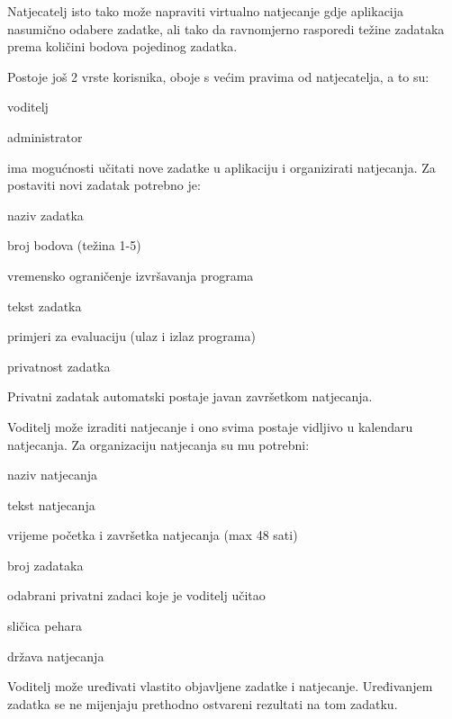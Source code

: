 		\eject
		
		Natjecatelj isto tako može napraviti virtualno natjecanje gdje aplikacija nasumično odabere zadatke, ali tako da ravnomjerno rasporedi težine zadataka prema količini bodova pojedinog zadatka. 
		
		
		
		Postoje još 2 vrste korisnika, oboje s većim pravima od natjecatelja, a to su:
		
		
		\begin{packed_item}
			\item voditelj
			\item administrator
		\end{packed_item}
		
				
		\textit{}
		ima mogućnosti učitati nove zadatke u aplikaciju i organizirati natjecanja.
		Za postaviti novi zadatak potrebno je:
		\begin{packed_item}
			\item naziv zadatka
			\item broj bodova (težina 1-5)
			\item vremensko ograničenje izvršavanja programa
			\item tekst zadatka
			\item primjeri za evaluaciju (ulaz i izlaz programa)
			\item privatnost zadatka
		\end{packed_item}
		Privatni zadatak automatski postaje javan završetkom natjecanja.
		
		
		Voditelj može izraditi natjecanje i ono svima postaje vidljivo u kalendaru natjecanja. Za organizaciju natjecanja su mu potrebni: 
		\begin{packed_item}
			\item naziv natjecanja
			\item tekst natjecanja
			\item vrijeme početka i završetka natjecanja (max 48 sati)
			\item broj zadataka
			\item odabrani privatni zadaci koje je voditelj učitao
			\item sličica pehara
			\item država natjecanja 
		\end{packed_item}
		
		Voditelj može uređivati vlastito objavljene zadatke i natjecanje. 
		Uređivanjem zadatka se ne mijenjaju prethodno ostvareni rezultati na tom zadatku. 
		
